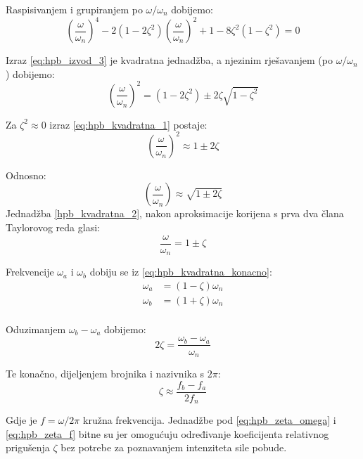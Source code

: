 Raspisivanjem i grupiranjem po $\omega/\omega_n$ dobijemo:
\begin{equation}\label{eq:hpb_izvod_3}
    \left(\frac{\omega}{\omega_n}\right)^4
    -2(1-2\zeta^2)\left(\frac{\omega}{\omega_n}\right)^2
    +1-8\zeta^2(1-\zeta^2)=0
\end{equation}

Izraz \eqref{eq:hpb_izvod_3} je kvadratna jednadžba, a njezinim rješavanjem (po
$\omega/\omega_n$) dobijemo:
\begin{equation}\label{eq:hpb_kvadratna_1}
    \left(\frac{\omega}{\omega_n}\right)^2 = 
        (1-2\zeta^2)\pm 2\zeta\sqrt{1-\zeta^2}
\end{equation}

Za $\zeta^2 \approx 0$ izraz \eqref{eq:hpb_kvadratna_1} postaje:
\begin{equation}
    \left(\frac{\omega}{\omega_n}\right)^2 \approx
        1 \pm 2\zeta
\end{equation}

Odnosno:
\begin{equation}\label{eq:hpb_kvadratna_2}
    \left(\frac{\omega}{\omega_n}\right)\approx
        \sqrt{1 \pm 2\zeta}
\end{equation}
Jednadžba \eqref{hpb_kvadratna_2}, nakon aproksimacije korijena s prva dva člana Taylorovog
reda glasi:
\begin{equation}\label{eq:hpb_kvadratna_konacno}
    \frac{\omega}{\omega_n} = 1 \pm \zeta
\end{equation}

Frekvencije $\omega_a$ i $\omega_b$ dobiju se iz \eqref{eq:hpb_kvadratna_konacno}:
\begin{align}
    \omega_a &= (1-\zeta)\omega_n\\
    \omega_b &= (1+\zeta)\omega_n\\
\end{align}

Oduzimanjem $\omega_b-\omega_a$ dobijemo:
\begin{equation}\label{eq:hpb_zeta_omega}
        2\zeta = \frac{\omega_b-\omega_a}{\omega_n}
\end{equation}

Te konačno, dijeljenjem brojnika i nazivnika s $2\pi$:
\begin{equation}\label{eq:hpb_zeta_f}
    \zeta\approx\frac{f_b-f_a}{2f_n}
\end{equation}

Gdje je $f=\omega/2\pi$ kružna frekvencija. Jednadžbe pod \eqref{eq:hpb_zeta_omega}
i \eqref{eq:hpb_zeta_f} bitne su jer omogućuju određivanje koeficijenta relativnog prigušenja
$\zeta$ bez potrebe za poznavanjem intenziteta sile pobude. 

